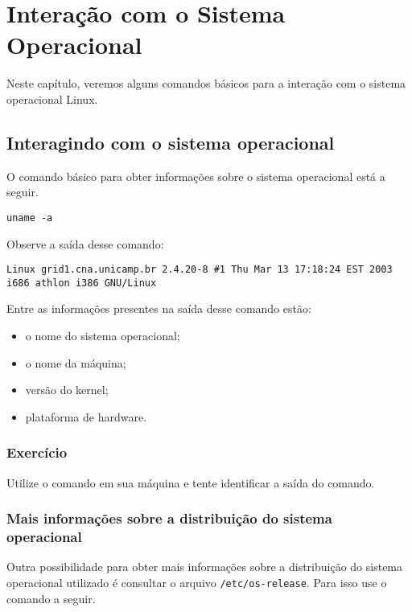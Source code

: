 \chapter{Interação com o Sistema Operacional}
Neste capítulo, veremos alguns comandos básicos para a interação com o sistema operacional Linux. 

\section{Interagindo com o sistema operacional}
O comando básico para obter informações sobre o sistema operacional está a seguir.

\begin{lstlisting}[style=MyBashStyle]
uname -a
\end{lstlisting}

Observe a saída desse comando:
\begin{lstlisting}[style=outputStyle]
Linux grid1.cna.unicamp.br 2.4.20-8 #1 Thu Mar 13 17:18:24 EST 2003 i686 athlon i386 GNU/Linux
\end{lstlisting}

Entre as informações presentes na saída desse comando estão:
\begin{itemize}
\setlength{\itemsep}{1pt}\setlength{\parskip}{0pt}  \setlength{\parsep}{0pt}
\item o nome do sistema operacional;
\item o nome da máquina;
\item versão do kernel;
\item plataforma de hardware.
\end{itemize}

\subsection{Exercício}
Utilize o comando  em sua máquina e tente identificar a saída do comando.


\subsection{Mais informações sobre a distribuição do sistema operacional}
Outra possibilidade para obter mais informações sobre a distribuição do sistema operacional utilizado é consultar o arquivo \texttt{/etc/os-release}. Para isso use o comando a seguir.

